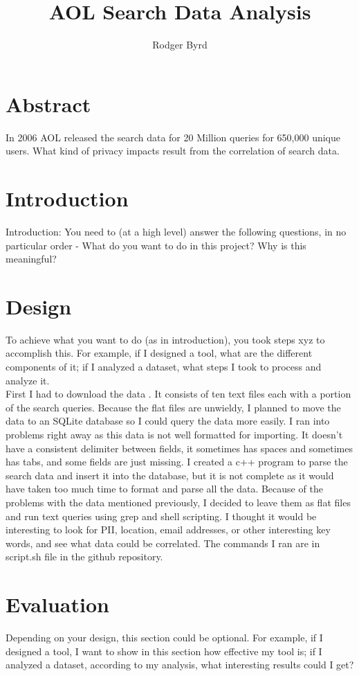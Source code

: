 \documentclass{article}
\begin{document}
\raggedright

\title{AOL Search Data Analysis}
\author{Rodger Byrd}
\maketitle

\section{Abstract}
In 2006 AOL released the search data for 20 Million queries for 650,000 unique users. What kind of privacy impacts result from the correlation of search data.
\section{Introduction}
Introduction: You need to (at a high level) answer the following questions, in no particular order - What do you want to do in this project? Why is this meaningful? 

\section{Design}
To achieve what you want to do (as in introduction), you took steps xyz to accomplish this. For example, if I designed a tool, what are the different components of it; if I analyzed a dataset, what steps I took to process and analyze it.\\
First I had to download the data \cite{aol}. It consists of ten text files each with a portion of the search queries. Because the flat files are unwieldy, I planned to move the data to an SQLite database so I could query the data more easily. I ran into problems right away as this data is not well formatted for importing.  It doesn’t have a consistent delimiter between fields, it sometimes has spaces and sometimes has tabs, and some fields are just missing. I created a c++ program to parse the search data and insert it into the database, but it is not complete as it would have taken too much time to format and parse all the data. Because of the problems with the data mentioned previously, I decided to leave them as flat files and run text queries using grep and shell scripting. I thought it would be interesting to look for PII, location, email addresses, or other interesting key words, and see what data could be correlated. The commands I ran are in script.sh file in the github repository\cite{git}.

\section{Evaluation}
Depending on your design, this section could be optional. For example, if I designed a tool, I want to show in this section how effective my tool is; if I analyzed a dataset, according to my analysis, what interesting results could I get?\\
\end{document}
